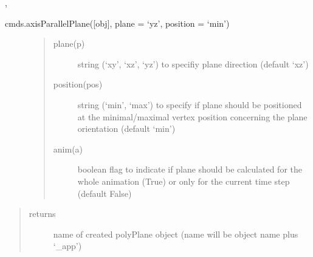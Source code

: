 \documentclass[letterpaper,10pt,english]{sphinxmanual}
\begin{document}
 {\hyperref[\detokenize{pk_src.centerPoint:centerpoint}]{}}, {\hyperref[\detokenize{pk_src.altitudeMap:altitudemap}]{}}

 cmds.axisParallelPlane({[}obj{]}, plane = ‘yz’, position = ‘min’)
\begin{description}
\item[{}] \leavevmode\begin{quote}\begin{description}
\item[{plane(p)}] \leavevmode
string (‘xy’, ‘xz’, ‘yz’) to specifiy plane direction (default ‘xz’)

\item[{position(pos)}] \leavevmode
string (‘min’, ‘max’) to specify if plane should be positioned at the minimal/maximal vertex position concerning the plane orientation (default ‘min’)

\item[{anim(a)}] \leavevmode
boolean flag to indicate if plane should be calculated for the whole animation (True) or only for the current time step (default False)

\end{description}\end{quote}

\end{description}
\begin{quote}\begin{description}
\item[{returns}] \leavevmode
name of created polyPlane object (name will be object name plus ‘\_app’)

\end{description}\end{quote}
\begin{description}
\item[{}] \leavevmode
\begin{sphinxVerbatim}[commandchars=\\\{\}]
     
\end{sphinxVerbatim}

\end{description}
\end{document}
